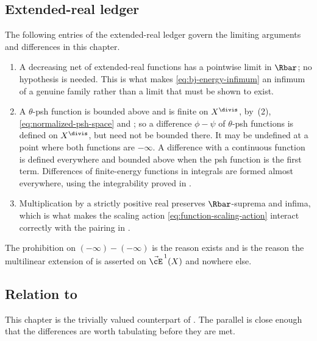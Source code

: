 \subsection{Extended-real ledger}
\label{sec:ch46-ledger}

The following entries of the extended-real ledger govern the limiting
arguments and differences in this chapter.

\begin{enumerate}
\item A decreasing net of extended-real functions has a pointwise limit in
      $\Rbar$; no hypothesis is needed.  This is what makes
      \eqref{eq:bj-energy-infimum} an infimum of a genuine family rather
      than a limit that must be shown to exist.
\item A $\theta$-psh function is bounded above and is finite on
      $X^{\divis}$, by \,(2),
      \eqref{eq:normalized-psh-space} and ;
      so a difference $\phi-\psi$ of $\theta$-psh functions is defined
      on $X^{\divis}$, but need not be bounded there. It may be
      undefined at a point where both functions are $-\infty$.
      A difference with a continuous function is defined everywhere and
      bounded above when the psh function is the first term. Differences
      of finite-energy functions in integrals are formed almost everywhere,
      using the integrability proved in .
\item Multiplication by a strictly positive real preserves
      $\Rbar$-suprema and infima, which is what makes the scaling action
      \eqref{eq:function-scaling-action} interact correctly with the
      pairing in .
\end{enumerate}

The prohibition on $(-\infty)-(-\infty)$ is the reason
 exists and is the reason the multilinear
extension of  is asserted on $\vec\cE^{\,1}(X)$ and
nowhere else.

\subsection{Relation to \texorpdfstring{}{Part III}}
\label{sec:ch46-part3}

This chapter is the trivially valued counterpart of
.  The parallel is close enough that the
differences are worth tabulating before they are met.

